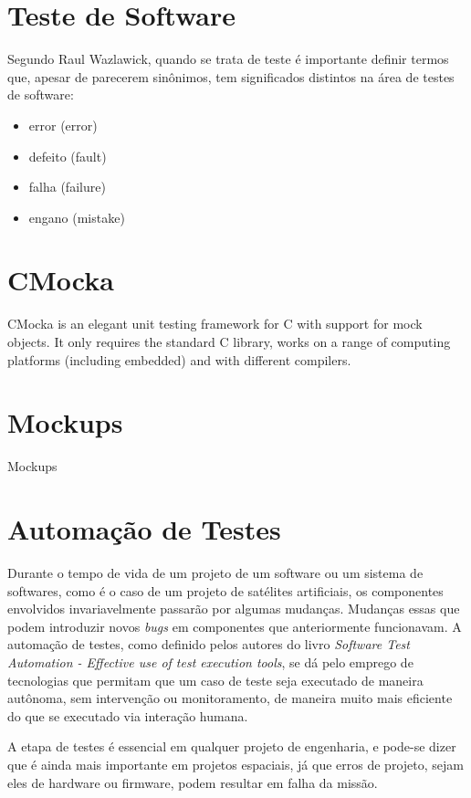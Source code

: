 \section{Teste de Software}
Segundo Raul Wazlawick, quando se trata de teste é importante definir termos que, apesar de parecerem sinônimos, tem significados distintos
na área de testes de software:

\begin{itemize}
    \item error (error)
    \item defeito (fault)
    \item falha (failure)
    \item engano (mistake)
\end{itemize}

\section{CMocka}
CMocka is an elegant unit testing framework for C with support for mock objects. It only requires the standard C library,
works on a range of computing platforms (including embedded) and with different compilers.

\section{Mockups}
Mockups

\section{Automação de Testes}
\label{section:test-automation}

Durante o tempo de vida de um projeto de um software ou um sistema de softwares, como é o caso de um projeto de satélites artificiais,
os componentes envolvidos invariavelmente passarão por algumas mudanças. Mudanças essas que podem introduzir novos \textit{bugs} em
componentes que anteriormente funcionavam. A automação de testes, como definido pelos autores do livro
\textit{Software Test Automation - Effective use of test execution tools}, se dá pelo emprego de tecnologias que permitam que um caso
de teste seja executado de maneira autônoma, sem intervenção ou monitoramento, de maneira muito mais eficiente\cite{software-automation}
do que se executado via interação humana.

A etapa de testes é essencial em qualquer projeto de engenharia, e pode-se dizer que é ainda mais importante em projetos espaciais, já
que erros de projeto, sejam eles de hardware ou firmware, podem resultar em falha da missão.

